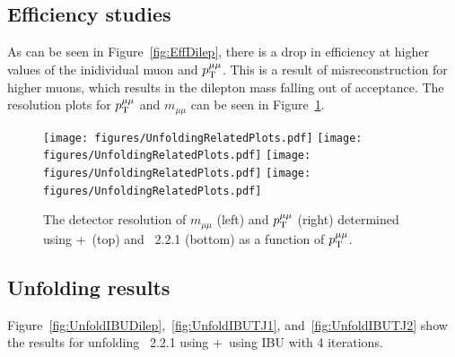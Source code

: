 \subsection{Efficiency studies}

As can be seen in Figure~\ref{fig:EffDilep}, there is a drop in efficiency at higher values of the inidividual muon \pt and $p_\mathrm{T}^{\mu\mu}$. This is a result of \pt misreconstruction for higher \pt muons, which results in the dilepton mass falling out of acceptance.
The resolution plots for $p_\mathrm{T}^{\mu\mu}$ and $m_{\mu\mu}$ can be seen in Figure~\ref{fig:Resmll}.

\begin{figure}[h!]
  \centering
  \texttt{[image: figures/UnfoldingRelatedPlots.pdf]}
  \texttt{[image: figures/UnfoldingRelatedPlots.pdf]}
  \texttt{[image: figures/UnfoldingRelatedPlots.pdf]}
  \texttt{[image: figures/UnfoldingRelatedPlots.pdf]}
  \caption{The detector resolution of $m_{\mu\mu}$ (left) and $p_\mathrm{T}^{\mu\mu}$ (right) determined using \powheg+\pythia~(top) and \sherpa~2.2.1 (bottom) as a function of $p_\mathrm{T}^{\mu\mu}$.}
  \label{fig:Resmll}
\end{figure}

\subsection{Unfolding results}
Figure~\ref{fig:UnfoldIBUDilep},~\ref{fig:UnfoldIBUTJ1}, and~\ref{fig:UnfoldIBUTJ2} show the results for unfolding \sherpa~2.2.1 using \powheg+\pythia~using IBU with 4 iterations.

